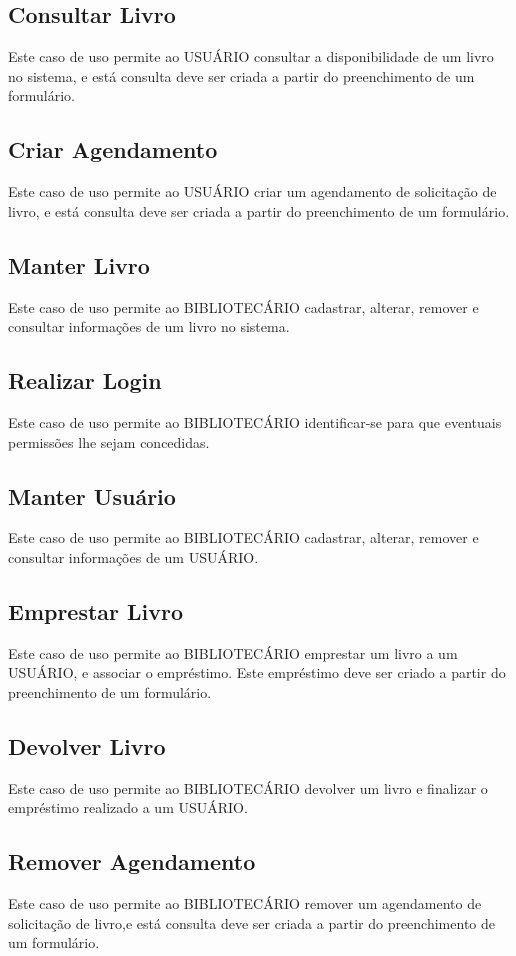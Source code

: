 \subsection{Consultar Livro}
Este caso de uso permite ao USUÁRIO consultar a disponibilidade de um livro no sistema, e está consulta deve ser criada a partir do preenchimento de um formulário.

\subsection{Criar Agendamento}
Este caso de uso permite ao USUÁRIO criar um agendamento de solicitação de livro, e está consulta deve ser criada a partir do preenchimento de um formulário.

\subsection{Manter Livro}
Este caso de uso permite ao BIBLIOTECÁRIO cadastrar, alterar, remover e consultar informações de um livro no sistema.

\subsection{Realizar Login}
Este caso de uso permite ao BIBLIOTECÁRIO identificar-se para que eventuais permissões lhe sejam concedidas.

\subsection{Manter Usuário}
Este caso de uso permite ao BIBLIOTECÁRIO cadastrar, alterar, remover e consultar informações de um USUÁRIO.

\subsection{Emprestar Livro}
Este caso de uso permite ao BIBLIOTECÁRIO emprestar um livro a um USUÁRIO, e associar o empréstimo. Este empréstimo deve ser criado a partir do preenchimento de um formulário. 

\subsection{Devolver Livro}
Este caso de uso permite ao BIBLIOTECÁRIO devolver um livro e finalizar o empréstimo realizado a um USUÁRIO. 

\subsection{Remover Agendamento}
Este caso de uso permite ao BIBLIOTECÁRIO remover um agendamento de solicitação de livro,e está consulta deve ser criada a partir do preenchimento de um formulário.

